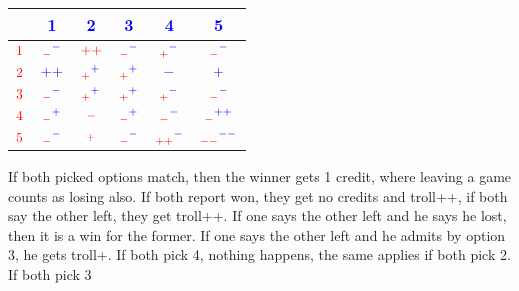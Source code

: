 \documentclass{article}
\begin{document}
\begin{center}
	\begin{tabular}{ c | c | c | c | c | c}
		 & \textcolor{blue}{1} & \textcolor{blue}{2} & \textcolor{blue}{3} & \textcolor{blue}{4} & \textcolor{blue}{5} \\ \hline
		$\textcolor{red}{1}$ & $\textcolor{red}{{}_-} \textcolor{blue}{{}^-} $ & $\textcolor{red}{++} $ & $\textcolor{red}{{}_-} \textcolor{blue}{{}^-}$ & $\textcolor{red}{{}_+} \textcolor{blue}{{}^-}$ & $\textcolor{red}{{}_-} \textcolor{blue}{{}^-}$ \\ \hline
		$\textcolor{red}{2}$ & $\textcolor{blue}{++}$ & $\textcolor{red}{{}_+} \textcolor{blue}{{}^+}$  & $\textcolor{red}{{}_+} \textcolor{blue}{{}^+}$ & $\textcolor{blue}{-}$ & $\textcolor{blue}{+}$ \\ \hline
		$\textcolor{red}{3}$ & $\textcolor{red}{{}_-} \textcolor{blue}{{}^-}$ & $\textcolor{red}{{}_+} \textcolor{blue}{{}^+}$ & $\textcolor{red}{{}_+} \textcolor{blue}{{}^+}$ & $\textcolor{red}{{}_+} \textcolor{blue}{{}^-}$ & $\textcolor{red}{{}_-} \textcolor{blue}{{}^-}$ \\ \hline
		$\textcolor{red}{4}$ &  $\textcolor{red}{{}_-} \textcolor{blue}{{}^+}$  &  $\textcolor{red}{{}_-}$  & $\textcolor{red}{{}_-} \textcolor{blue}{{}^+}$ & $\textcolor{red}{{}_-} \textcolor{blue}{{}^-}$ & $\textcolor{red}{{}_{-}} \textcolor{blue}{{}^{++}}$ \\ \hline
		$\textcolor{red}{5}$ & $\textcolor{red}{{}_-} \textcolor{blue}{{}^-}$ & $\textcolor{red}{{}_+} $ & $\textcolor{red}{{}_-} \textcolor{blue}{{}^-}$ & $\textcolor{red}{{}_{++}} \textcolor{blue}{{}^-}$ & $\textcolor{red}{{}_{--}} \textcolor{blue}{{}^{--}}$ \\
	\end{tabular}
\end{center}
%
If both picked options match, then the winner gets 1 credit, where leaving a game counts as losing also. If both report won, they get no credits and troll++, if both say the other left, they get troll++. If one says the other left and he says he lost, then it is a win for the former. If one says the other left and he admits by option 3, he gets troll+. If both pick 4, nothing happens, the same applies if both pick 2. If both pick 3
%
\newline \newline
%
\end{document}
